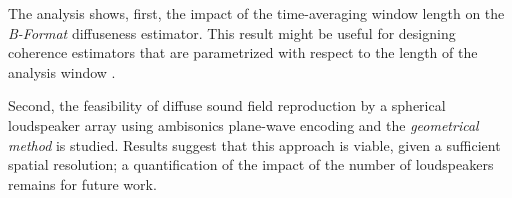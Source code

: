 The analysis shows, first, the impact of the time-averaging window length on the \textit{B-Format} diffuseness estimator.
This result might be useful for designing coherence estimators that are parametrized with respect to the length of the analysis window \cite{thiergart_diffuseness_2011}.

Second, the feasibility of diffuse sound field reproduction by a spherical loudspeaker array using ambisonics plane-wave encoding and the \textit{geometrical method} is studied. 
Results suggest that this approach is viable, given a sufficient spatial resolution; a quantification of the impact of the number of loudspeakers remains for future work.





